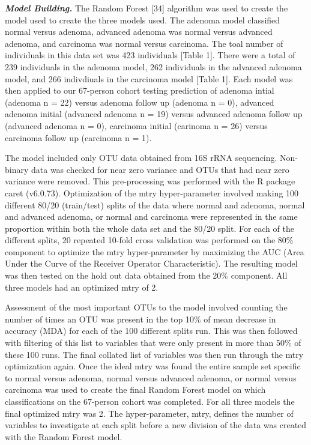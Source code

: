 \documentclass[12pt,]{article}
\begin{document}
\textbf{\emph{Model Building.}} The Random Forest {[}34{]} algorithm was
used to create the model used to create the three models used. The
adenoma model classified normal versus adenoma, advanced adenoma was
normal versus advanced adenoma, and carcinoma was normal versus
carcinoma. The toal number of individuals in this data set was 423
individuals {[}Table 1{]}. There were a total of 239 individuals in the
adenoma model, 262 individuals in the advanced adenoma model, and 266
indivdiuals in the carcinoma model {[}Table 1{]}. Each model was then
applied to our 67-person cohort testing prediction of adenoma intial
(adenoma n = 22) versus adenoma follow up (adenoma n = 0), advanced
adenoma initial (advanced adenoma n = 19) versus advanced adenoma follow
up (advanced adenoma n = 0), carcinoma initial (carinoma n = 26) versus
carcinoma follow up (carcinoma n = 1).

The model included only OTU data obtained from 16S rRNA sequencing.
Non-binary data was checked for near zero variance and OTUs that had
near zero variance were removed. This pre-processing was performed with
the R package caret (v6.0.73). Optimization of the mtry hyper-parameter
involved making 100 different 80/20 (train/test) splits of the data
where normal and adenoma, normal and advanced adenoma, or normal and
carcinoma were represented in the same proportion within both the whole
data set and the 80/20 split. For each of the different splits, 20
repeated 10-fold cross validation was performed on the 80\% component to
optimize the mtry hyper-parameter by maximizing the AUC (Area Under the
Curve of the Receiver Operator Characteristic). The resulting model was
then tested on the hold out data obtained from the 20\% component. All
three models had an optimized mtry of 2.

Assessment of the most important OTUs to the model involved counting the
number of times an OTU was present in the top 10\% of mean decrease in
accuracy (MDA) for each of the 100 different splits run. This was then
followed with filtering of this list to variables that were only present
in more than 50\% of these 100 runs. The final collated list of
variables was then run through the mtry optimization again. Once the
ideal mtry was found the entire sample set specific to normal versus
adenoma, normal versus advanced adenoma, or normal versus carcinoma was
used to create the final Random Forest model on which classifications on
the 67-person cohort was completed. For all three models the final
optimized mtry was 2. The hyper-parameter, mtry, defines the number of
variables to investigate at each split before a new division of the data
was created with the Random Forest model.
\end{document}
